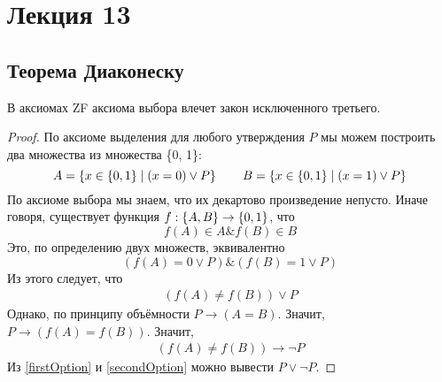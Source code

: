 \section{Лекция 13}

\subsection{Теорема Диаконеску}
\begin{theorem}[Диаконеску]
    В аксиомах ZF аксиома выбора влечет закон исключенного третьего.
\end{theorem}

\begin{proof}

По аксиоме выделения для любого утверждения $P$ мы можем построить два множества из множества \{0, 1\}:
\[
    A = \left\{x \in \left\{0, 1\right\} \mid \left(x = 0\right) \lor P\right\} \qquad
    B = \left\{x \in \left\{0, 1\right\} \mid \left(x = 1\right) \lor P\right\}
\]
По аксиоме выбора мы знаем, что их декартово произведение непусто.
Иначе говоря, существует функция $f : \left\{A, B\right\} \to \left\{0, 1\right\}$, что
\[
    f(A) \in A \& f(B) \in B
\]
Это, по определению двух множеств, эквивалентно
\[
    \left(f(A) = 0 \vee P\right) \& \left(f(B) = 1 \vee P\right)
\]
Из этого следует, что
\begin{gather}
    \left(f(A) \neq f(B)\right) \vee P \label{firstOption} \tag{$*$}
\end{gather}
Однако, по принципу объёмности $P \to \left(A=B\right)$. Значит, $P \to \left(f(A) = f(B)\right)$. Значит,
\begin{gather}
    \left(f(A) \neq f(B)\right) \to \neg P \label{secondOption} \tag{$**$}
\end{gather}
Из \ref{firstOption} и \ref{secondOption} можно вывести $P \vee \neg P$.

\end{proof}

